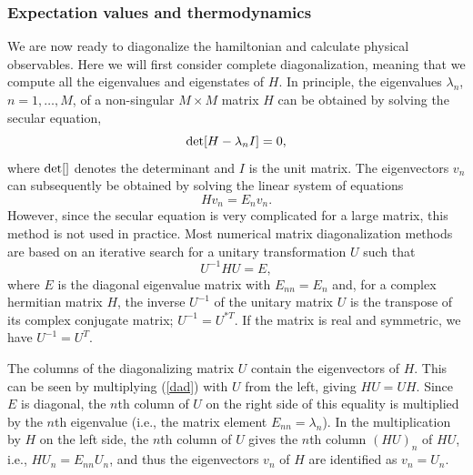 \documentclass[draft,numberedheadings]{aipproc}
\begin{document}
\subsubsection{Expectation values and thermodynamics}
\label{expvalues}

We are now ready to diagonalize the hamiltonian and calculate physical observables. Here we will first consider complete diagonalization, meaning that we 
compute all the eigenvalues and eigenstates of $H$. In principle, the eigenvalues $\lambda_n$, $n=1,\ldots,M$, of a non-singular $M\times M$ matrix ${H}$ 
can be obtained by solving the secular equation,
\begin{equation}
{\rm det}[H-\lambda_n I]=0,
\end{equation}
where ${\rm det}[]$ denotes the determinant and $I$ is the unit matrix. The eigenvectors $v_n$ can 
subsequently be obtained by solving the linear system of equations
\begin{equation}
{Hv}_n = E_n{v}_n.
\end{equation}
However, since the secular equation is very complicated for a large matrix, this method is not used in practice. Most numerical matrix diagonalization methods 
are based on an iterative search for a unitary transformation $U$ such that
\begin{equation}
{U}^{-1}{H}{U}={E},
\label{dad}
\end{equation}
where ${E}$ is the diagonal eigenvalue matrix with $E_{nn}=E_n$ and, for a complex hermitian matrix $H$, the inverse ${U}^{-1}$ of the unitary matrix 
${U}$ is the transpose of its complex conjugate matrix; ${U}^{-1}={U}^{*T}$. If the  matrix is real and symmetric, we have ${U}^{-1}={U}^{T}$. 

The columns of the diagonalizing matrix $U$ contain the eigenvectors of $H$. This can be seen by multiplying (\ref{dad}) with $U$ from the left, giving 
${HU} = {UH}$. Since $E$ is diagonal, the $n$th column of $U$ on the right side of this equality is multiplied by the $n$th eigenvalue (i.e., the matrix 
element $E_{nn}=\lambda_n$). In the multiplication by $H$ on the left side, the $n$th column of $U$ gives the $n$th column $(HU)_n$ of $HU$, i.e., 
${H}{U}_n = E_{nn}{U}_n$, and thus the eigenvectors $v_n$ of $H$ are identified as $v_n = U_n$. 
\end{document}
